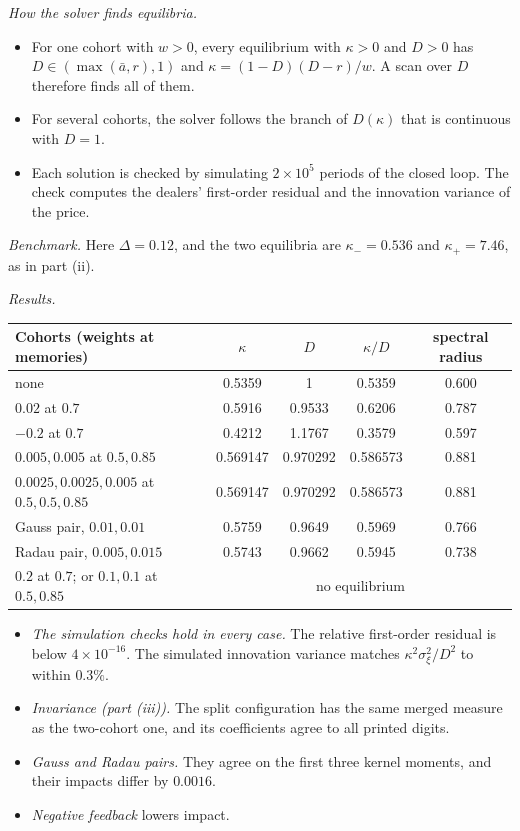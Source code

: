 \emph{How the solver finds equilibria.}
\begin{itemize}[itemsep=1pt,topsep=2pt]
\item For one cohort with $w>0$, every equilibrium with $\kappa>0$ and $D>0$ has $D\in(\max(\bar a,r),1)$ and $\kappa=(1-D)(D-r)/w$. A scan over $D$ therefore finds all of them.
\item For several cohorts, the solver follows the branch of $D(\kappa)$ that is continuous with $D=1$.
\item Each solution is checked by simulating $2\times10^5$ periods of the closed loop. The check computes the dealers' first-order residual and the innovation variance of the price.
\end{itemize}

\emph{Benchmark.} Here $\Delta=0.12$, and the two equilibria are $\kappa_-=0.536$ and $\kappa_+=7.46$, as in part (ii).

\emph{Results.}
\begin{center}\small
\begin{tabular}{lcccc}
\hline
Cohorts (weights at memories) & $\kappa$ & $D$ & $\kappa/D$ & spectral radius\\
\hline
none & 0.5359 & 1 & 0.5359 & 0.600\\
$0.02$ at $0.7$ & 0.5916 & 0.9533 & 0.6206 & 0.787\\
$-0.2$ at $0.7$ & 0.4212 & 1.1767 & 0.3579 & 0.597\\
$0.005,0.005$ at $0.5,0.85$ & 0.569147 & 0.970292 & 0.586573 & 0.881\\
$0.0025,0.0025,0.005$ at $0.5,0.5,0.85$ & 0.569147 & 0.970292 & 0.586573 & 0.881\\
Gauss pair, $0.01,0.01$ & 0.5759 & 0.9649 & 0.5969 & 0.766\\
Radau pair, $0.005,0.015$ & 0.5743 & 0.9662 & 0.5945 & 0.738\\
$0.2$ at $0.7$; or $0.1,0.1$ at $0.5,0.85$ & \multicolumn{4}{c}{no equilibrium}\\
\hline
\end{tabular}
\end{center}
\begin{itemize}[itemsep=1pt,topsep=2pt]
\item \emph{The simulation checks hold in every case.} The relative first-order residual is below $4\times10^{-16}$. The simulated innovation variance matches $\kappa^2\sigma_\xi^2/D^2$ to within $0.3\%$.
\item \emph{Invariance (part (iii)).} The split configuration has the same merged measure as the two-cohort one, and its coefficients agree to all printed digits.
\item \emph{Gauss and Radau pairs.} They agree on the first three kernel moments, and their impacts differ by $0.0016$.
\item \emph{Negative feedback} lowers impact.
\end{itemize}

